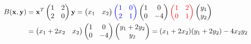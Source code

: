 \begin{examples}{}{}
\begin{enumerate}
\begin{align*}
			B({\mathbf{x}},{\mathbf{y}})&={\mathbf{x}}^T
			\begin{pmatrix}
				1&2\\
				2&0
			\end{pmatrix}
			{\mathbf{y}}=
			\begin{pmatrix}
		 		x_1&x_2
			\end{pmatrix}
			\textcolor{blue}{
				\begin{pmatrix}
		 			1&0\\
		 			2&1
				\end{pmatrix}
			}
			\begin{pmatrix}
				1&0\\
				0&-4
			\end{pmatrix}
			\textcolor{red}{
				\begin{pmatrix}
		 			1&2\\
		 			0&1
				\end{pmatrix}
			}
			\begin{pmatrix}y_1\\y_2\end{pmatrix}\\
 		 	&=
			\begin{pmatrix}
		 		x_1+2x_2&x_2
			\end{pmatrix}
			\begin{pmatrix}
				1&0\\
				0&-4
			\end{pmatrix}
			\begin{pmatrix}y_1+2y_2\\y_2\end{pmatrix}
			=(x_1+2x_2)(y_1+2y_2)-4x_2y_2
		\end{align*}
		

\end{enumerate}
\end{examples}
